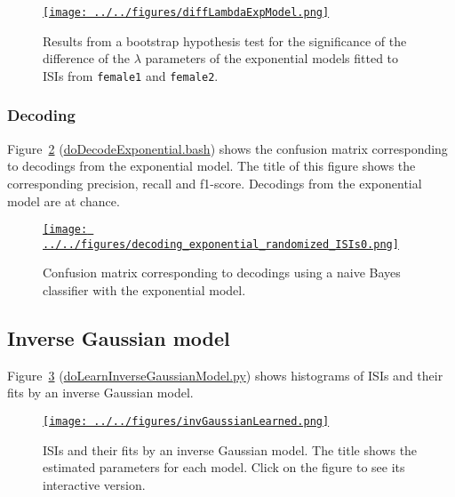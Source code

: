 \documentclass[10pt]{article}
\begin{document}
\begin{figure}
    \href{http://www.gatsby.ucl.ac.uk/~rapela/singleNeuronSpikesAnalysisTutorial/figures/diffLambdaExpModel.html}{\texttt{[image: ../../figures/diffLambdaExpModel.png]}}
    \caption{Results from a bootstrap hypothesis test for the significance of the difference of the $\lambda$ parameters of the exponential models fitted to ISIs from \texttt{female1} and \texttt{female2}.}
    \label{fig:diffLambdaExpModel_fit}
\end{figure}

\subsubsection{Decoding}

Figure~\ref{fig:expModelConusionMatrix} (\href{https://github.com/joacorapela/singleNeuronSpikesAnalysisTutorial/blob/master/code/scripts/doDecodeExponential.bash}{doDecodeExponential.bash}) shows the confusion matrix
corresponding to decodings from the exponential model. The title of
this figure shows the corresponding precision, recall and f1-score.
Decodings from the exponential model are at chance.

\begin{figure}
    \href{http://www.gatsby.ucl.ac.uk/~rapela/singleNeuronSpikesAnalysisTutorial/figures/decoding_exponential_randomized_ISIs0.html}{\texttt{[image: ../../figures/decoding\_exponential\_randomized\_ISIs0.png]}}
    \caption{Confusion matrix corresponding to decodings using a naive Bayes classifier with the exponential model.}
    \label{fig:expModelConusionMatrix}
\end{figure}

\subsection{Inverse Gaussian model}
\label{sec:inverse_Gaussian_model}

Figure~\ref{fig:invGaussian_model_fit} (\href{https://github.com/joacorapela/singleNeuronSpikesAnalysisTutorial/blob/master/code/scripts/doLearnInverseGaussianModel.py}{doLearnInverseGaussianModel.py}) shows histograms of ISIs and
their fits by an inverse Gaussian model.

\begin{figure}
    \href{http://www.gatsby.ucl.ac.uk/~rapela/singleNeuronSpikesAnalysisTutorial/figures/invGaussianLearned.html}{\texttt{[image: ../../figures/invGaussianLearned.png]}}

    \caption{ISIs and their fits by an inverse Gaussian model. The
    title shows the estimated parameters for each model. Click on the
    figure to see its interactive version.}

    \label{fig:invGaussian_model_fit}
\end{figure}
\end{document}
